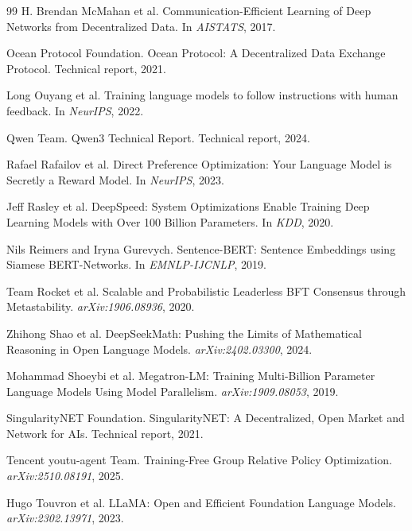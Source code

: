 \begin{thebibliography}{99}
H. Brendan McMahan et al.
\newblock Communication-Efficient Learning of Deep Networks from Decentralized Data.
\newblock In \textit{AISTATS}, 2017.

Ocean Protocol Foundation.
\newblock Ocean Protocol: A Decentralized Data Exchange Protocol.
\newblock Technical report, 2021.

Long Ouyang et al.
\newblock Training language models to follow instructions with human feedback.
\newblock In \textit{NeurIPS}, 2022.

Qwen Team.
\newblock Qwen3 Technical Report.
\newblock Technical report, 2024.

Rafael Rafailov et al.
\newblock Direct Preference Optimization: Your Language Model is Secretly a Reward Model.
\newblock In \textit{NeurIPS}, 2023.

Jeff Rasley et al.
\newblock DeepSpeed: System Optimizations Enable Training Deep Learning Models with Over 100 Billion Parameters.
\newblock In \textit{KDD}, 2020.

Nils Reimers and Iryna Gurevych.
\newblock Sentence-BERT: Sentence Embeddings using Siamese BERT-Networks.
\newblock In \textit{EMNLP-IJCNLP}, 2019.

Team Rocket et al.
\newblock Scalable and Probabilistic Leaderless BFT Consensus through Metastability.
\newblock \textit{arXiv:1906.08936}, 2020.

Zhihong Shao et al.
\newblock DeepSeekMath: Pushing the Limits of Mathematical Reasoning in Open Language Models.
\newblock \textit{arXiv:2402.03300}, 2024.

Mohammad Shoeybi et al.
\newblock Megatron-LM: Training Multi-Billion Parameter Language Models Using Model Parallelism.
\newblock \textit{arXiv:1909.08053}, 2019.

SingularityNET Foundation.
\newblock SingularityNET: A Decentralized, Open Market and Network for AIs.
\newblock Technical report, 2021.

Tencent youtu-agent Team.
\newblock Training-Free Group Relative Policy Optimization.
\newblock \textit{arXiv:2510.08191}, 2025.

Hugo Touvron et al.
\newblock LLaMA: Open and Efficient Foundation Language Models.
\newblock \textit{arXiv:2302.13971}, 2023.


\end{thebibliography}
